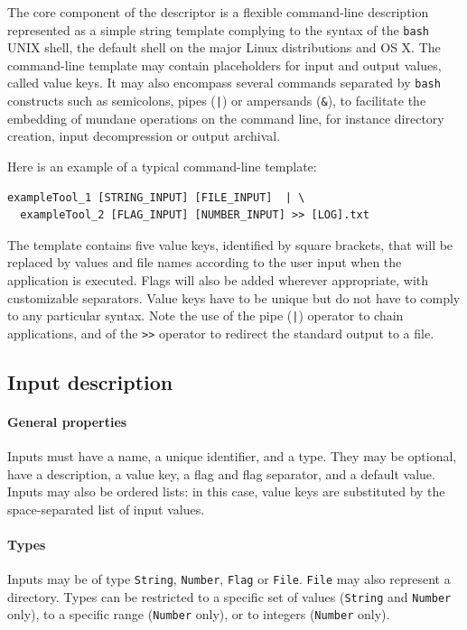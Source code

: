 \documentclass[a4paper,num-refs]{oup-contemporary}
\begin{document}
The core component of the descriptor is a flexible command-line
description represented as a simple string template complying to the
syntax of the \texttt{bash} UNIX shell, the default shell on the major
Linux distributions and OS X. The command-line template may contain
placeholders for input and output values, called value keys. It may
also encompass several commands separated by \texttt{bash} constructs
such as semicolons, pipes (\texttt{|}) or ampersands (\texttt{\&}), to
facilitate the embedding of mundane operations on the command line,
for instance directory creation, input decompression or output
archival.

Here is an example of a typical command-line template:
\begin{verbatim}
exampleTool_1 [STRING_INPUT] [FILE_INPUT]  | \
  exampleTool_2 [FLAG_INPUT] [NUMBER_INPUT] >> [LOG].txt
\end{verbatim}
The template contains five value keys, identified by square brackets,
that will be replaced by values and file names according to the user
input when the application is executed. Flags will also be added
wherever appropriate, with customizable separators. Value keys have to
be unique but do not have to comply to any particular syntax. Note the
use of the pipe (\texttt{|}) operator to chain applications, and of
the \texttt{>>} operator to redirect the standard output to a file.

\subsection{Input description}

\paragraph{General properties} Inputs must have a name, a unique
identifier, and a type. They may be optional, have a description, a
value key, a flag and flag separator, and a default value. Inputs may
also be ordered lists: in this case, value keys are substituted by the
space-separated list of input values.

\paragraph{Types} Inputs may be of type \texttt{String}, \texttt{Number},
\texttt{Flag} or \texttt{File}. \texttt{File} may also represent a directory.
Types can be restricted to a specific set of values (\texttt{String} 
and \texttt{Number} only), to a specific range (\texttt{Number} only), or to
integers (\texttt{Number} only).
\end{document}
